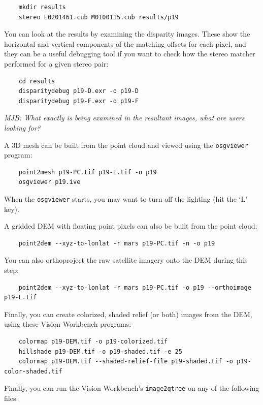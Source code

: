 \begin{verbatim}
	mkdir results
	stereo E0201461.cub M0100115.cub results/p19
\end{verbatim}

You can look at the results by examining the disparity images. These
show the horizontal and vertical components of the matching offsets
for each pixel, and they can be a useful debugging tool if you want
to check how the stereo matcher performed for a given stereo pair:

\begin{verbatim}
	cd results
	disparitydebug p19-D.exr -o p19-D     
	disparitydebug p19-F.exr -o p19-F
\end{verbatim}

\emph{MJB: What exactly is being examined in the resultant images, what are users looking for?}

A 3D mesh can be built from the point cloud and viewed using the
\texttt{osgviewer} program:

\begin{verbatim}
	point2mesh p19-PC.tif p19-L.tif -o p19
	osgviewer p19.ive
\end{verbatim}

When the \texttt{osgviewer} starts, you may want to turn off the
lighting (hit the `L' key).

A gridded DEM with floating point pixels can also be built from the point cloud:

\begin{verbatim}
	point2dem --xyz-to-lonlat -r mars p19-PC.tif -n -o p19
\end{verbatim}

You can also orthoproject the raw satellite imagery onto the DEM during this step:

\begin{verbatim}
	point2dem --xyz-to-lonlat -r mars p19-PC.tif -o p19 --orthoimage p19-L.tif
\end{verbatim}

Finally, you can create colorized, shaded relief (or both) images from the DEM, using these Vision Workbench programs:

\begin{verbatim}
	colormap p19-DEM.tif -o p19-colorized.tif
	hillshade p19-DEM.tif -o p19-shaded.tif -e 25
	colormap p19-DEM.tif --shaded-relief-file p19-shaded.tif -o p19-color-shaded.tif
\end{verbatim}

Finally, you can run the Vision Workbench's \texttt{image2qtree} on any of the following files:


